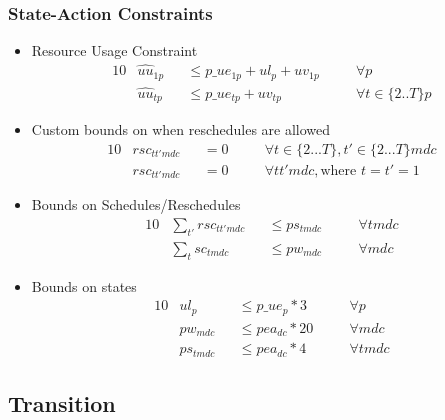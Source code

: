 \subsubsection{State-Action Constraints}
\label{state-action constraints}
\begin{itemize}
	
	\item Resource Usage Constraint
	\begin{alignat}{10}
		& \hat{uu}_{1p} 
		&& \le p\_ue_{1p} + ul_{p} + uv_{1p} \quad 
		&& \forall p \\
		& \hat{uu}_{tp} 
		&& \le p\_ue_{tp} + uv_{tp} \quad
		&& \forall t \in \{ 2..T \}p 
	\end{alignat}
	
	\item Custom bounds on when reschedules are allowed
	\begin{alignat}{10}
		& rsc_{tt'mdc} && = 0 \quad && \forall t \in \{ 2...T \}, t' \in \{2...T\} mdc \\
		& rsc_{tt'mdc} && = 0 \quad && \forall tt'mdc, \text{where } t=t'=1 
	\end{alignat}  
	
	\item Bounds on Schedules/Reschedules
	\begin{alignat}{10}
		& \sum_{t'} rsc_{tt'mdc} 	&& \le ps_{tmdc} \quad  && \forall tmdc  \\
		& \sum_{t} sc_{tmdc} 		&& \le pw_{mdc} \quad 	&& \forall mdc 
	\end{alignat}  
	
	\item Bounds on states
	\begin{alignat}{10}
		& ul_{p} 	&& \le p\_ue_{p} * 3 \quad 			&& \forall p \\
		& pw_{mdc} 	&& \le pea_{dc} * 20 \quad 			&& \forall mdc \\
		& ps_{tmdc} && \le pea_{dc} * 4 \quad 			&& \forall tmdc
	\end{alignat}
\end{itemize}

\subsection{Transition}

